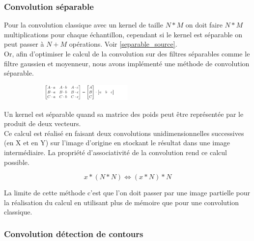     \subsubsection*{Convolution séparable} \label{conv_separable}

        Pour la convolution classique avec un kernel de taille $N*M$ on doit faire $N*M$ multiplications pour chaque échantillon,
        cependant si le kernel est séparable on peut passer à $N+M$ opérations. Voir \ref{separable_source}.
        \\

        Or, afin d'optimiser le calcul de la convolution sur des filtres séparables comme le filtre gaussien et moyenneur, nous avons implémenté une
        méthode de convolution séparable.
        
        \begin{figure}[!h]
            \centering
            \begin{subfigure}[b]{1\textwidth}
                \centering
                \includegraphics[width=0.5\textwidth]{report_src/separableConv1.png}
            \end{subfigure}
        \end{figure}

        Un kernel est séparable quand sa matrice des poids peut être représentée par le produit de deux vecteurs.
        \\

        Ce calcul est réalisé en faisant deux convolutions unidimensionnelles successives (en X et en Y) sur l'image d'origine en stockant le résultat dans une image intermédiaire.
        La propriété d'associativité de la convolution rend ce calcul possible.

        \[
            x * (N * N)  \iff (x * N) * N
        \]

        La limite de cette méthode c'est que l'on doit passer par une image partielle pour la réalisation du calcul en
        utilisant plus de mémoire que pour une convolution classique.
        \\



    \subsubsection*{Convolution détection de contours} \label{conv_edges}

